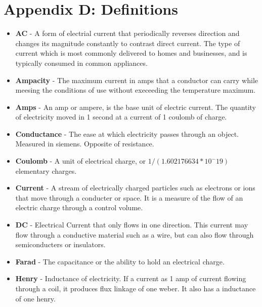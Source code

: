 \documentclass[12pt]{article}
\begin{document}
\pagebreak
\section{Appendix D: Definitions}

\begin{itemize}
    \item \textbf{AC} - A form of electrial current that periodically reverses direction and changes its magnitude constantly to contrast direct current. The type of current which is most commonly delivered to homes and businesses, and is typically consumed in common appliances. 

    \item \textbf{Ampacity} - The maximum current in amps that a conductor can carry while meesing the conditions of use without execeeding the temperature maximum.

    \item \textbf{Amps} - An amp or ampere, is the base unit of electric current. The quantity of electricity moved in 1 second at a current of 1 coulomb of charge. 

    \item \textbf{Conductance} - The ease at which electricity passes through an object. Measured in siemens. Opposite of resistance.

    \item \textbf{Coulomb} - A unit of electrical charge, or $1 / (1.602176634*10^-19)$ elementary charges. 

    \item \textbf{Current} - A stream of electrically charged particles such as electrons or ions that move through a conducter or space. It is a measure of the flow of an electric charge through a control volume.

    \item \textbf{DC} - Electrical Current that only flows in one direction. This current may flow through a conductive material such as a wire, but can also flow through semiconducters or insulators. 

    \item \textbf{Farad} - The capacitance or the ability to hold an electrical charge. 

    \item \textbf{Henry} - Inductance of electricity. If a current as 1 amp of current flowing through a coil, it produces flux linkage of one weber. It also has a inductance of one henry.
   

\end{itemize}
\end{document}
